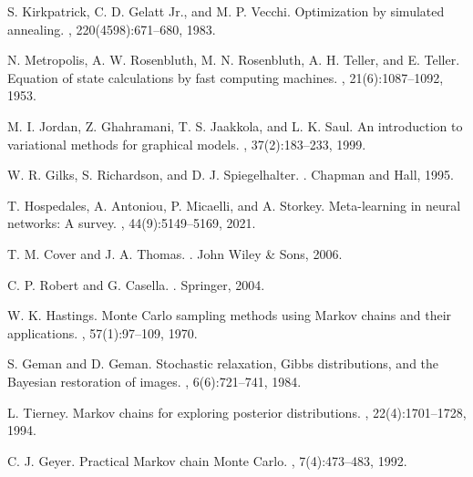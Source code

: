 \documentclass[12pt,a4paper]{article}
\begin{document}
\begin{table}[h]

\begin{thebibliography}{99}

S. Kirkpatrick, C. D. Gelatt Jr., and M. P. Vecchi.
\newblock Optimization by simulated annealing.
, 220(4598):671--680, 1983.

N. Metropolis, A. W. Rosenbluth, M. N. Rosenbluth, A. H. Teller, and E. Teller.
\newblock Equation of state calculations by fast computing machines.
, 21(6):1087--1092, 1953.

M. I. Jordan, Z. Ghahramani, T. S. Jaakkola, and L. K. Saul.
\newblock An introduction to variational methods for graphical models.
, 37(2):183--233, 1999.

W. R. Gilks, S. Richardson, and D. J. Spiegelhalter.
.
\newblock Chapman and Hall, 1995.

T. Hospedales, A. Antoniou, P. Micaelli, and A. Storkey.
\newblock Meta-learning in neural networks: A survey.
, 44(9):5149--5169, 2021.

T. M. Cover and J. A. Thomas.
.
\newblock John Wiley \& Sons, 2006.

C. P. Robert and G. Casella.
.
\newblock Springer, 2004.

W. K. Hastings.
\newblock Monte Carlo sampling methods using Markov chains and their applications.
, 57(1):97--109, 1970.

S. Geman and D. Geman.
\newblock Stochastic relaxation, Gibbs distributions, and the Bayesian restoration of images.
, 6(6):721--741, 1984.

L. Tierney.
\newblock Markov chains for exploring posterior distributions.
, 22(4):1701--1728, 1994.

C. J. Geyer.
\newblock Practical Markov chain Monte Carlo.
, 7(4):473--483, 1992.


\end{thebibliography}
\end{table}
\end{document}
